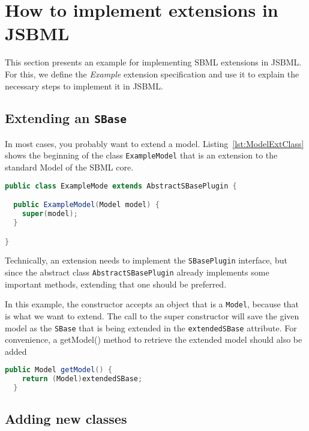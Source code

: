 \section{How to implement extensions in JSBML}

This section presents an example for implementing SBML extensions in JSBML.
For this, we define the \emph{Example} extension specification and use it to explain the necessary steps to implement it in JSBML.

\subsection{Extending an \texttt{SBase}}

In most cases, you probably want to extend a model.
Listing~\vref{lst:ModelExtClass} shows the beginning of the class \texttt{ExampleModel} that is an extension to the standard Model of the SBML core.
\begin{lstlisting}[language=Java,caption={Extending \texttt{AbstractSBasePlugin}},label=lst:ModelExtClass]
public class ExampleMode extends AbstractSBasePlugin {

  public ExampleModel(Model model) {
    super(model);
  }

}
\end{lstlisting}
Technically, an extension needs to implement the \texttt{SBasePlugin} interface,
but since the abstract class \texttt{AbstractSBasePlugin} already implements some important methods, extending that one should be preferred.

In this example, the constructor accepts an object that is a \texttt{Model}, because that is what we want to extend.
The call to the super constructor will save the given model as the \texttt{SBase} that is being extended in the \texttt{extendedSBase} attribute.
For convenience, a getModel() method to retrieve the extended model should also be added
\begin{lstlisting}[language=Java,caption={Convenience method to retrieve the extended model},label=lst:ModelExtGetModel]
  public Model getModel() {
    return (Model)extendedSBase;
  }
\end{lstlisting}


\subsection{Adding new classes}

